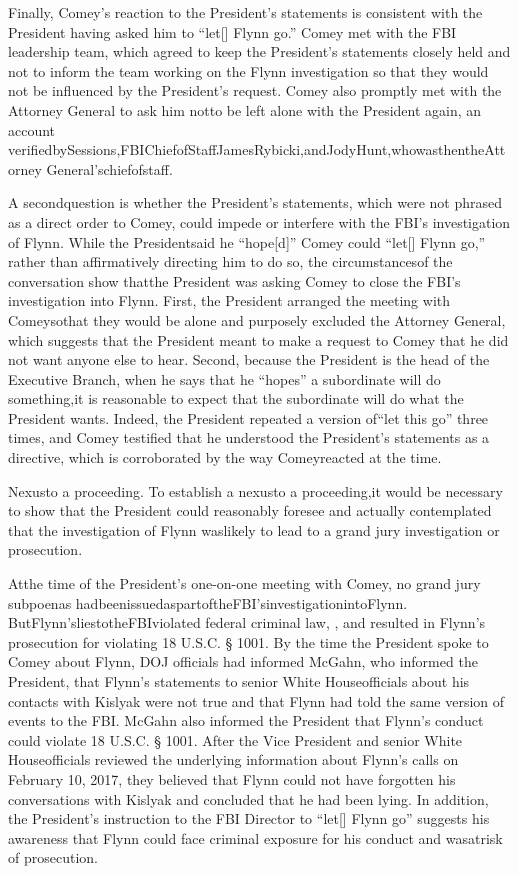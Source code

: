 Finally, Comey’s reaction to the President’s statements is consistent with the President having asked him to “let[] Flynn go.”
Comey met with the FBI leadership team, which agreed to keep the President’s statements closely held and not to inform the team working on the Flynn investigation so that they would not be influenced by the President’s request.
Comey also promptly met with the Attorney General to ask him notto be left alone with the President again, an account verifiedbySessions,FBIChiefofStaffJamesRybicki,andJodyHunt,whowasthentheAttorney General’schiefofstaff.

A secondquestion is whether the President’s statements, which were not phrased as a direct order to Comey, could impede or interfere with the FBI’s investigation of Flynn.
While the Presidentsaid he “hope[d]” Comey could “let[] Flynn go,” rather than affirmatively directing him to do so, the circumstancesof the conversation show thatthe President was asking Comey to close the FBI’s investigation into Flynn.
First, the President arranged the meeting with Comeysothat they would be alone and purposely excluded the Attorney General, which suggests that the President meant to make a request to Comey that he did not want anyone else to hear.
Second, because the President is the head of the Executive Branch, when he says that he “hopes” a subordinate will do something,it is reasonable to expect that the subordinate will do what the President wants.
Indeed, the President repeated a version of“let this go” three times, and Comey testified that he understood the President’s statements as a directive, which is corroborated by the way Comeyreacted at the time.

Nexusto a proceeding.
To establish a nexusto a proceeding,it would be necessary to show that the President could reasonably foresee and actually contemplated that the investigation of Flynn waslikely to lead to a grand jury investigation or prosecution.

Atthe time of the President’s one-on-one meeting with Comey, no grand jury subpoenas hadbeenissuedaspartoftheFBI’sinvestigationintoFlynn.
ButFlynn’sliestotheFBIviolated federal criminal law, , and resulted in Flynn’s prosecution for violating 18 U.S.C. § 1001.
By the time the President spoke to Comey about Flynn, DOJ officials had informed McGahn, who informed the President, that Flynn’s statements to senior White Houseofficials about his contacts with Kislyak were not true and that Flynn had told the same version of events to the FBI.
McGahn also informed the President that Flynn’s conduct could violate 18 U.S.C. § 1001.
After the Vice President and senior White Houseofficials reviewed the underlying information about Flynn’s calls on February 10, 2017, they believed that Flynn could not have forgotten his conversations with Kislyak and concluded that he had been lying.
In addition, the President’s instruction to the FBI Director to “let[] Flynn go” suggests his awareness that Flynn could face criminal exposure for his conduct and wasatrisk of prosecution.

